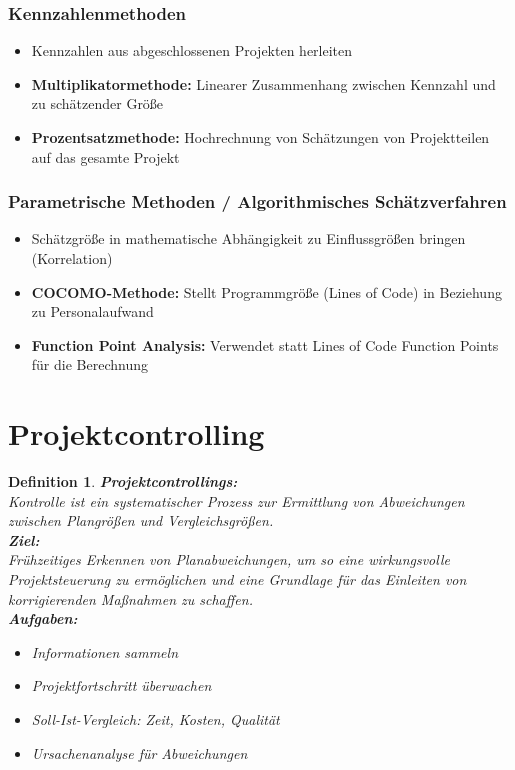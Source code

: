 \documentclass[11pt,a4paper]{article}
\newenvironment{de}[1]
{\begin{mdframed}[style=de]\begin{mydef}{\textbf{#1:}}\\} 
{\end{mydef}\end{mdframed}}
\newtheorem{mydef}{Definition}
\begin{document}
\begin{minipage}[t]{0.49\textwidth}

\subsubsection{Kennzahlenmethoden}

\begin{itemize}
\item Kennzahlen aus abgeschlossenen Projekten herleiten
\item \textbf{Multiplikatormethode:} Linearer Zusammenhang zwischen Kennzahl und zu schätzender Größe
\item \textbf{Prozentsatzmethode:} Hochrechnung von Schätzungen von Projektteilen auf das gesamte Projekt
\end{itemize}

\subsubsection{Parametrische Methoden / Algorithmisches Schätzverfahren}

\begin{itemize}
	\item Schätzgröße in mathematische Abhängigkeit zu Einflussgrößen
bringen (Korrelation)
	\item \textbf{COCOMO-Methode:} Stellt Programmgröße (Lines of Code) in Beziehung zu Personalaufwand
	\item \textbf{Function Point Analysis:} Verwendet statt Lines of Code Function Points für die Berechnung
\end{itemize}
\end{minipage}
\pagebreak
\section{Projektcontrolling}
\begin{de}{Projektcontrollings}
Kontrolle ist ein systematischer Prozess zur Ermittlung von
Abweichungen zwischen Plangrößen und Vergleichsgrößen.\\
\textbf{Ziel:}\\
Frühzeitiges Erkennen von Planabweichungen, um so eine
wirkungsvolle Projektsteuerung zu ermöglichen und eine Grundlage
für das Einleiten von korrigierenden Maßnahmen zu schaffen.\\
\textbf{Aufgaben:}
\begin{itemize}
\item Informationen sammeln
\item Projektfortschritt überwachen
\item Soll-Ist-Vergleich: Zeit, Kosten, Qualität
\item Ursachenanalyse für Abweichungen
\end{itemize}
\end{de}
\end{document}

